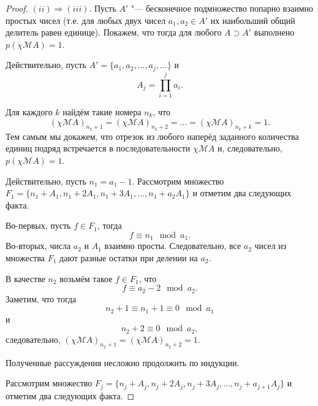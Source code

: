 \begin{proof}
	$(ii) \Rightarrow (iii)$.
	Пусть $A'$ "--- бесконечное подмножество попарно взаимно простых чисел
	(т.е. для любых двух чисел $a_1, a_2 \in A'$ их наибольший общий делитель равен единице).
	Покажем, что
	тогда для любого $A \supset A' $ выполнено $p(\chi\mathscr{M}A)=1$.	

	Действительно,
	пусть $A' = \{ a_1, a_2, ..., a_j, ... \}$ и
	\begin{equation}
		\label{eq:ac0_primes_A_j_prod_des}
		A_j = \prod_{i=1}^j a_i
		.
	\end{equation}

	Для каждого $k$ найдём такие номера $n_k$, что
	\begin{equation}
		(\chi\mathscr{M}A)_{n_k+1} = (\chi\mathscr{M}A)_{n_k+2} = \dots = (\chi\mathscr{M}A)_{n_k+k} = 1
		.
	\end{equation}
	Тем самым мы докажем, что отрезок из любого наперёд заданного количества единиц подряд
	встречается в последовательности $\chi\mathscr{M}A$ и, следовательно, $p(\chi\mathscr{M}A) = 1$.

	Действительно,
	пусть $n_1 = a_1 - 1$.
	Рассмотрим множество  $F_1 = \{ n_1 + A_1, n_1 + 2A_1, n_1 + 3A_1, \dots, n_1 + a_2A_1 \}$
	и отметим два следующих факта.

	Во-первых, пусть $f \in F_1$,
	тогда
	\begin{equation}
		f \equiv n_1 \mod a_1
		.
	\end{equation}
	Во-вторых, числа $a_2$ и $A_1$ взаимно просты.
	Следовательно, все $a_2$ чисел из множества $F_1$ дают разные остатки при делении на $a_2$.

	В качестве $n_2$ возьмём такое $f\in F_1$, что
	\begin{equation}
		f \equiv a_2 - 2 \mod a_2
		.
	\end{equation}
	Заметим, что тогда
	\begin{equation}
		n_2 + 1 \equiv n_1 + 1 \equiv 0 \mod a_1
	\end{equation}
	и
	\begin{equation}
		n_2 + 2 \equiv 0 \mod a_2
		,
	\end{equation}
	следовательно,
	$(\chi\mathscr{M}A)_{n_2 + 1} = (\chi\mathscr{M}A)_{n_2 + 2} = 1$.

	Полученные рассуждения несложно продолжить по индукции.

	Рассмотрим множество  $F_{j} = \{ n_j + A_j, n_j + 2A_j, n_j + 3A_j, \dots, n_j + a_{j+1}A_j \}$
	и отметим два следующих факта.


\end{proof}
